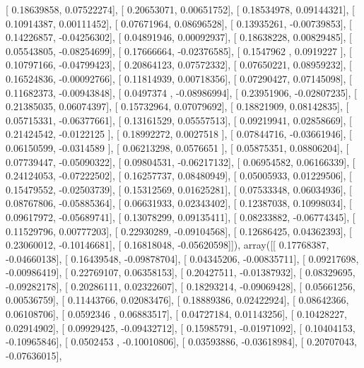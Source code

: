 \documentclass{article}
\begin{document}
       [ 0.18639858,  0.07522274],
       [ 0.20653071,  0.00651752],
       [ 0.18534978,  0.09144321],
       [ 0.10914387,  0.00111452],
       [ 0.07671964,  0.08696528],
       [ 0.13935261, -0.00739853],
       [ 0.14226857, -0.04256302],
       [ 0.04891946,  0.00092937],
       [ 0.18638228,  0.00829485],
       [ 0.05543805, -0.08254699],
       [ 0.17666664, -0.02376585],
       [ 0.1547962 ,  0.0919227 ],
       [ 0.10797166, -0.04799423],
       [ 0.20864123,  0.07572332],
       [ 0.07650221,  0.08959232],
       [ 0.16524836, -0.00092766],
       [ 0.11814939,  0.00718356],
       [ 0.07290427,  0.07145098],
       [ 0.11682373, -0.00943848],
       [ 0.0497374 , -0.08986994],
       [ 0.23951906, -0.02807235],
       [ 0.21385035,  0.06074397],
       [ 0.15732964,  0.07079692],
       [ 0.18821909,  0.08142835],
       [ 0.05715331, -0.06377661],
       [ 0.13161529,  0.05557513],
       [ 0.09219941,  0.02858669],
       [ 0.21424542, -0.0122125 ],
       [ 0.18992272,  0.0027518 ],
       [ 0.07844716, -0.03661946],
       [ 0.06150599, -0.0314589 ],
       [ 0.06213298,  0.0576651 ],
       [ 0.05875351,  0.08806204],
       [ 0.07739447, -0.05090322],
       [ 0.09804531, -0.06217132],
       [ 0.06954582,  0.06166339],
       [ 0.24124053, -0.07222502],
       [ 0.16257737,  0.08480949],
       [ 0.05005933,  0.01229506],
       [ 0.15479552, -0.02503739],
       [ 0.15312569,  0.01625281],
       [ 0.07533348,  0.06034936],
       [ 0.08767806, -0.05885364],
       [ 0.06631933,  0.02343402],
       [ 0.12387038,  0.10998034],
       [ 0.09617972, -0.05689741],
       [ 0.13078299,  0.09135411],
       [ 0.08233882, -0.06774345],
       [ 0.11529796,  0.00777203],
       [ 0.22930289, -0.09104568],
       [ 0.12686425,  0.04362393],
       [ 0.23060012, -0.10146681],
       [ 0.16818048, -0.05620598]]), array([[ 0.17768387, -0.04660138],
       [ 0.16439548, -0.09878704],
       [ 0.04345206, -0.00835711],
       [ 0.09217698, -0.00986419],
       [ 0.22769107,  0.06358153],
       [ 0.20427511, -0.01387932],
       [ 0.08329695, -0.09282178],
       [ 0.20286111,  0.02322607],
       [ 0.18293214, -0.09069428],
       [ 0.05661256,  0.00536759],
       [ 0.11443766,  0.02083476],
       [ 0.18889386,  0.02422924],
       [ 0.08642366,  0.06108706],
       [ 0.0592346 ,  0.06883517],
       [ 0.04727184,  0.01143256],
       [ 0.10428227,  0.02914902],
       [ 0.09929425, -0.09432712],
       [ 0.15985791, -0.01971092],
       [ 0.10404153, -0.10965846],
       [ 0.0502453 , -0.10010806],
       [ 0.03593886, -0.03618984],
       [ 0.20707043, -0.07636015],
\end{document}
